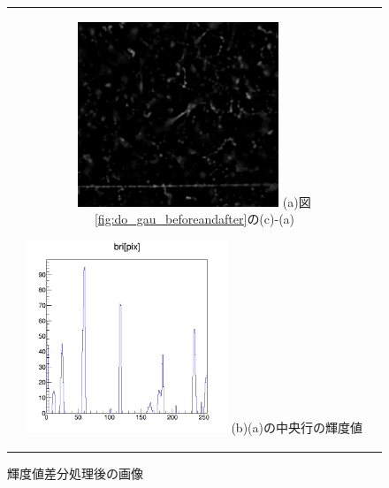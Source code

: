 \documentclass[12pt,a4paper]{jarticle}
\begin{document}
\begin{figure}[htbp]
    \begin{center}
      \begin{tabular}{c}
        \begin{minipage}{0.5\hsize}
          \begin{center}
            \includegraphics[clip, width=60mm]{sub.png}
            \hspace{1.6cm} (a)図\ref{fig:do_gau_beforeandafter}の(c)-(a)
          \end{center}
        \end{minipage}

        \begin{minipage}{0.5\hsize}
          \begin{center}
            \includegraphics[clip, width=60mm]{sub_hist.png}
            \hspace{1.6cm} (b)(a)の中央行の輝度値
          \end{center}
        \end{minipage}
    
      \end{tabular}
      \caption{輝度値差分処理後の画像\label{fig:do_sub}}
    \end{center}
\end{figure}
\end{document}
